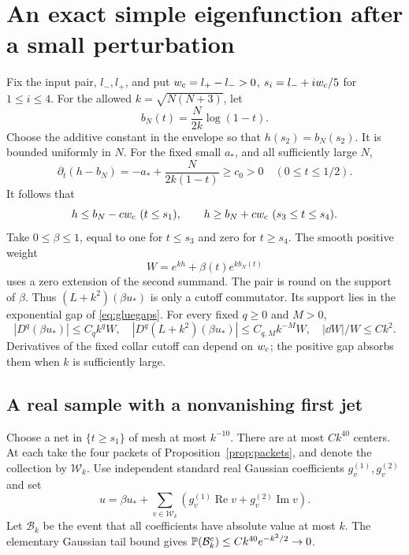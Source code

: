 \section{An exact simple eigenfunction after a small perturbation}
\label{sec:exact}

Fix the input pair, \(l_-,l_+\), and put
\(w_{\rm c}=l_+-l_->0\),
\(s_i=l_-+i w_{\rm c}/5\) for \(1\le i\le4\).
For the allowed \(k=\sqrt{N(N+3)}\), let
\[
 b_N(t)=\frac{N}{2k}\log(1-t).
\]
Choose the additive constant in the envelope so that
\(h(s_2)=b_N(s_2)\). It is bounded uniformly in \(N\).
For the fixed small \(a_*\), and all sufficiently large \(N\),
\[
 \partial_t(h-b_N)
       =-a_*+\frac{N}{2k(1-t)}\ge c_0>0
       \quad(0\le t\le1/2).
\]
It follows that
\begin{equation}\label{eq:gluegaps}
 h\le b_N-c w_{\rm c}\ (t\le s_1),\qquad
 h\ge b_N+c w_{\rm c}\ (s_3\le t\le s_4).
\end{equation}
Take \(0\le\beta\le1\), equal to one for \(t\le s_3\) and
zero for \(t\ge s_4\). The smooth positive weight
\begin{equation}\label{eq:weight}
 W=e^{kh}+\beta(t)e^{kb_N(t)}
\end{equation}
uses a zero extension of the second summand.
The pair is round on the support of \(\beta\).
Thus \((L+k^2)(\beta u_*)\) is only a cutoff commutator.
Its support lies in the exponential gap of \eqref{eq:gluegaps}.
For every fixed \(q\ge0\) and \(M>0\),
\begin{equation}\label{eq:beamweight}
 |D^q(\beta u_*)|\le C_qk^qW,\quad
 |D^q(L+k^2)(\beta u_*)|\le C_{q,M}k^{-M}W,\quad
 |\dd W|/W\le Ck^2 .
\end{equation}
Derivatives of the fixed collar cutoff can depend on \(w_{\rm c}\);
the positive gap absorbs them when \(k\) is sufficiently large.

\subsection{A real sample with a nonvanishing first jet}

Choose a net in \(\{t\ge s_1\}\) of mesh at most \(k^{-10}\).
There are at most \(Ck^{40}\) centers. At each take the four
packets of Proposition~\ref{prop:packets}, and denote the collection
by \(\mathcal W_k\). Use independent standard real Gaussian
coefficients \(g_v^{(1)},g_v^{(2)}\) and set
\begin{equation}\label{eq:random}
 u=\beta u_*+\sum_{v\in\mathcal W_k}
       (g_v^{(1)}\operatorname{Re}v+
                         g_v^{(2)}\operatorname{Im}v).
\end{equation}
Let \(\mathcal B_k\) be the event that all coefficients have
absolute value at most \(k\). The elementary Gaussian tail bound gives
\(\mathbb P(\mathcal B_k^c)\le Ck^{40}e^{-k^2/2}\to0\).

